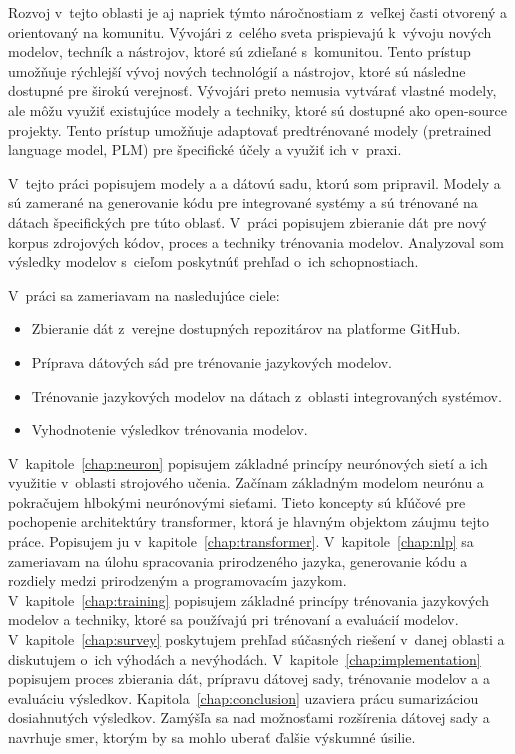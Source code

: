 Rozvoj v~tejto oblasti je aj napriek týmto náročnostiam z~veľkej časti otvorený a orientovaný na komunitu. Vývojári z~celého sveta prispievajú k~vývoju nových modelov, techník a nástrojov, ktoré sú zdieľané s~komunitou. Tento prístup umožňuje rýchlejší vývoj nových technológií a nástrojov, ktoré sú následne dostupné pre širokú verejnosť. Vývojári preto nemusia vytvárať vlastné modely, ale môžu využiť existujúce modely a techniky, ktoré sú dostupné ako open-source projekty. Tento prístup umožňuje adaptovať predtrénované modely (pretrained language model, PLM) pre špecifické účely a využiť ich v~praxi.

V~tejto práci popisujem modely \MC{} a \MCfim{} a dátovú sadu, ktorú som pripravil. Modely \MC{} a \MCfim{} sú zamerané na generovanie kódu pre integrované systémy a sú trénované na dátach špecifických pre túto oblasť. V~práci popisujem zbieranie dát pre nový korpus zdrojových kódov, proces a techniky trénovania modelov. Analyzoval som výsledky modelov s~cieľom poskytnúť prehľad o~ich schopnostiach.

\noindent V~práci sa zameriavam na nasledujúce ciele:
\begin{itemize}
    \item Zbieranie dát z~verejne dostupných repozitárov na platforme GitHub.
    \item Príprava dátových sád pre trénovanie jazykových modelov.
    \item Trénovanie jazykových modelov na dátach z~oblasti integrovaných systémov.
    \item Vyhodnotenie výsledkov trénovania modelov.
\end{itemize}

V~kapitole~\ref{chap:neuron} popisujem základné princípy neurónových sietí a ich využitie v~oblasti strojového učenia. Začínam základným modelom neurónu a pokračujem hlbokými neurónovými sieťami. Tieto koncepty sú kľúčové pre pochopenie architektúry transformer, ktorá je hlavným objektom záujmu tejto práce. Popisujem ju v~kapitole~\ref{chap:transformer}. V~kapitole~\ref{chap:nlp} sa zameriavam na úlohu spracovania prirodzeného jazyka, generovanie kódu a rozdiely medzi prirodzeným a programovacím jazykom. V~kapitole~\ref{chap:training} popisujem základné princípy trénovania jazykových modelov a techniky, ktoré sa používajú pri trénovaní a evaluácií modelov. V~kapitole~\ref{chap:survey} poskytujem prehľad súčasných riešení v~danej oblasti a diskutujem o~ich výhodách a nevýhodách. V~kapitole~\ref{chap:implementation} popisujem proces zbierania dát, prípravu dátovej sady, trénovanie modelov \MC{} a \MCfim{} a evaluáciu výsledkov. Kapitola~\ref{chap:conclusion} uzaviera prácu sumarizáciou dosiahnutých výsledkov. Zamýšľa sa nad možnosťami rozšírenia dátovej sady a navrhuje smer, ktorým by sa mohlo uberať ďalšie výskumné úsilie.


